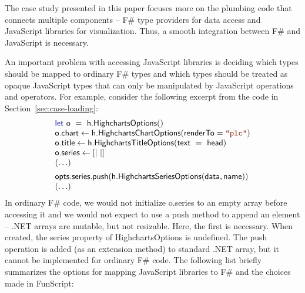 \documentclass[submission,copyright,creativecommons]{eptcs}
\newcommand{\kvd}[1]{\textnormal{\textcolor{kvdclr}{\sffamily #1}}}
\newcommand{\str}[1]{\textnormal{\textcolor{strclr}{\ttfamily "#1"}}}
\newcommand{\ident}[1]{\textnormal{\sffamily #1}}
\begin{document}
The case study presented in this paper focuses more on the plumbing code that connects multiple
components -- F\# type providers for data access and JavaScript libraries for visualization. Thus,
a smooth integration between F\# and JavaScript is necessary.

An important problem with accessing JavaScript libraries is deciding which types should be
mapped to ordinary F\# types and which types should be treated as opaque JavaScript types that
can only be manipulated by JavaScript operations and operators. For example, consider the following
excerpt from the code in Section~\ref{sec:case-loading}:
%
\begin{equation*}
\begin{array}{lll}
 \kvd{let}~\ident{o}~=~\ident{h.HighchartsOptions}() \\
 \ident{o.chart} \leftarrow \ident{h.HighchartsChartOptions}(\ident{renderTo}=\str{plc}) \\
 \ident{o.title} \leftarrow \ident{h.HighchartsTitleOptions}(\ident{text}~=~\ident{head}) \\
 \ident{o.series} \leftarrow \lbrack| ~ |\rbrack \\
 (\ldots)
 \\[0.5em]
 \ident{opts.series.push}(\ident{h.HighchartsSeriesOptions}(\ident{data}, \ident{name}))  \\
 (\ldots)
\end{array}
\end{equation*}
%
In ordinary F\# code, we would not initialize \ident{o.series} to an empty array before
accessing it and we would not expect to use a \ident{push} method to append an element --
.NET arrays are mutable, but not resizable. Here, the first is necessary. When created,
the \ident{series} property of \ident{HighchartsOptions} is \kvd{undefined}. The \ident{push}
operation is added (as an extension method) to standard .NET array, but it cannot be
implemented for ordinary F\# code. The following list briefly summarizes the options for
mapping JavaScript libraries to F\# and the choices made in FunScript:
\end{document}
